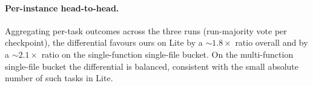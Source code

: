 \paragraph{Per-instance head-to-head.}
Aggregating per-task outcomes across the three runs (run-majority vote per
checkpoint), the differential favours ours on Lite by a $\sim\!1.8\times$
ratio overall and by a $\sim\!2.1\times$ ratio on the single-function
single-file bucket. On the multi-function single-file bucket the
differential is balanced, consistent with the small absolute number of
such tasks in Lite.
